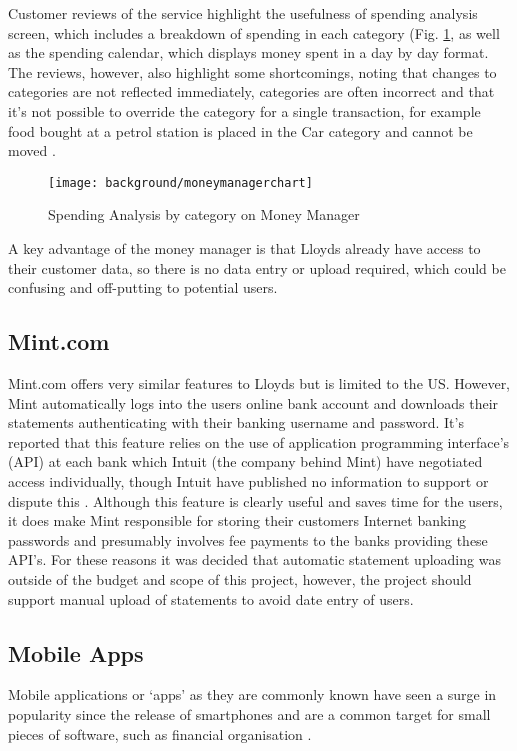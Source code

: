 Customer reviews of the service highlight the usefulness of spending analysis screen, which includes a breakdown of spending in each \gls{category} (Fig. \ref{fig:moneymanager}, as well as the spending calendar, which displays money spent in a day by day format.
%
The reviews, however, also highlight some shortcomings, noting that changes to categories are not reflected immediately, categories are often incorrect and that it's not possible to override the \gls{category} for a single transaction, for example food bought at a petrol station is placed in the Car \gls{category} and cannot be moved \cite{moneywatch2011lloyds, moneysupermarket2011lloyds}.

\begin{figure}[h]
    \centering
    \texttt{[image: background/moneymanagerchart]}
    \caption{Spending Analysis by category on Money Manager \parencite{lloyds2014money}}
    \label{fig:moneymanager}
\end{figure}

A key advantage of the money manager is that Lloyds already have access to their customer data, so there is no data entry or upload required, which could be confusing and off-putting to potential users.

\subsection{Mint.com}
Mint.com offers very similar features to Lloyds but is limited to the US. However, Mint automatically logs into the users online bank account and downloads their statements authenticating with their banking username and password. It's reported that this feature relies on the use of application programming interface's (API) at each bank which Intuit (the company behind Mint) have negotiated access individually, though Intuit have published no information to support or dispute this \cite{stackoverflow2012bankingapi, stackoverflow2012bankingapi2}.
% 
Although this feature is clearly useful and saves time for the users, it does make Mint responsible for storing their customers Internet banking passwords and presumably involves fee payments to the banks providing these API's.
%
For these reasons it was decided that automatic statement uploading was outside of the budget and scope of this project, however, the project should support manual upload of statements to avoid date entry of users.

\subsection{Mobile Apps}
Mobile applications or `apps' as they are commonly known have seen a surge in popularity since the release of smartphones and are a common target for small pieces of software, such as financial organisation \parencite{purcell2011half}.

